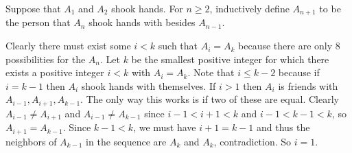 Suppose that $A_1$ and $A_2$ shook hands. For $n\geq2$, inductively define $A_{n+1}$ to be the person that $A_n$ shook hands with besides $A_{n-1}$.

Clearly there must exist some $i<k$ such that $A_i=A_k$ because there are only $8$ possibilities for the $A_n$. Let $k$ be the smallest positive integer for which there exists a positive integer $i<k$ with $A_i=A_k$. Note that $i\leq k-2$ because if $i=k-1$ then $A_i$ shook hands with themselves. If $i>1$ then $A_i$ is friends with $A_{i-1},A_{i+1},A_{k-1}$. The only way this works is if two of these are equal. Clearly $A_{i-1}\neq A_{i+1}$ and $A_{i-1}\neq A_{k-1}$ since $i-1<i+1<k$ and $i-1<k-1<k$, so $A_{i+1}=A_{k-1}$. Since $k-1<k$, we must have $i+1=k-1$ and thus the neighbors of $A_{k-1}$ in the sequence are $A_k$ and $A_k$, contradiction. So $i=1$.

